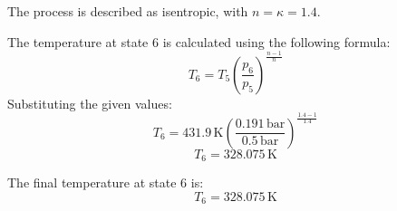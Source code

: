 The process is described as isentropic, with \( n = \kappa = 1.4 \).  

The temperature at state \( 6 \) is calculated using the following formula:  
\[
T_6 = T_5 \left( \frac{p_6}{p_5} \right)^{\frac{n-1}{n}}
\]  
Substituting the given values:  
\[
T_6 = 431.9 \, \text{K} \left( \frac{0.191 \, \text{bar}}{0.5 \, \text{bar}} \right)^{\frac{1.4-1}{1.4}}
\]  
\[
T_6 = 328.075 \, \text{K}
\]  

The final temperature at state \( 6 \) is:  
\[
T_6 = 328.075 \, \text{K}
\]